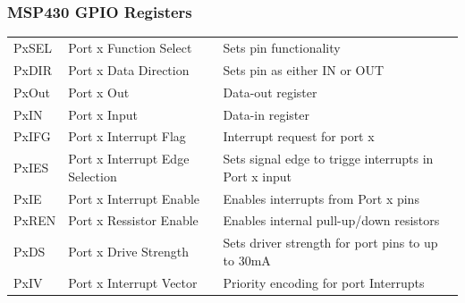 \subsubsection{MSP430 GPIO Registers}
\begin{tabular}{lll}
    PxSEL   &Port x Function Select             & Sets pin functionality  \\ 
    PxDIR   &Port x Data Direction              & Sets pin as either IN or OUT \\ 
    PxOut   &Port x Out                         & Data-out register \\ 
    PxIN    &Port x Input                       & Data-in register  \\ 
    PxIFG   &Port x Interrupt Flag              & Interrupt request for port x \\ 
    PxIES   &Port x Interrupt Edge Selection    & Sets signal edge to trigge interrupts in Port x input  \\ 
    PxIE    &Port x Interrupt Enable            & Enables interrupts from Port x pins \\ 
    PxREN   &Port x Ressistor Enable            & Enables internal pull-up/down resistors \\ 
    PxDS    &Port x Drive Strength              & Sets driver strength for port pins to up to 30mA  \\ 
    PxIV    &Port x Interrupt Vector            & Priority encoding for port Interrupts \\ 
\end{tabular} 


\clearpage